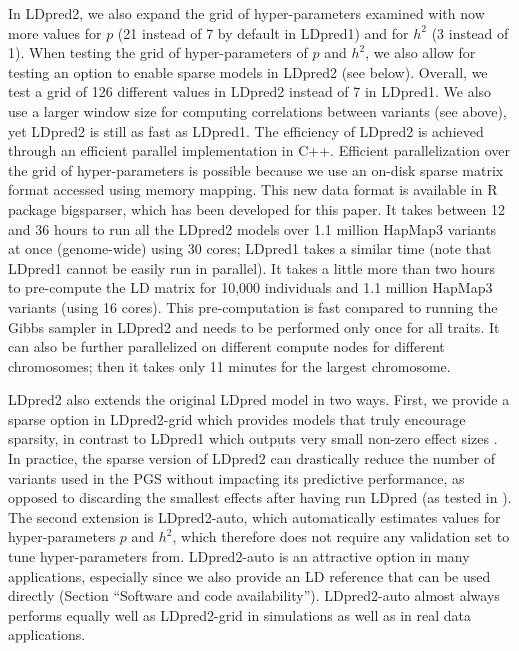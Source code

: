 \documentclass{bioinfo}
\begin{document}
In LDpred2, we also expand the grid of hyper-parameters examined with now more values for $p$ (21 instead of 7 by default in LDpred1) and for $h^2$ (3 instead of 1).
When testing the grid of hyper-parameters of $p$ and $h^2$, we also allow for testing an option to enable sparse models in LDpred2 (see below).
Overall, we test a grid of 126 different values in LDpred2 instead of 7 in LDpred1.
We also use a larger window size for computing correlations between variants (see above), yet LDpred2 is still as fast as LDpred1.
The efficiency of LDpred2 is achieved through an efficient parallel implementation in C++.
Efficient parallelization over the grid of hyper-parameters is possible because we use an on-disk sparse matrix format accessed using memory mapping. 
This new data format is available in R package bigsparser, which has been developed for this paper. 
It takes between 12 and 36 hours to run all the LDpred2 models over 1.1 million HapMap3 variants at once (genome-wide) using 30 cores; LDpred1 takes a similar time (note that LDpred1 cannot be easily run in parallel).
It takes a little more than two hours to pre-compute the LD matrix for 10,000 individuals and 1.1 million HapMap3 variants (using 16 cores). This pre-computation is fast compared to running the Gibbs sampler in LDpred2 and needs to be performed only once for all traits. It can also be further parallelized on different compute nodes for different chromosomes; then it takes only 11 minutes for the largest chromosome.

LDpred2 also extends the original LDpred model in two ways.
First, we provide a sparse option in LDpred2-grid which provides models that truly encourage sparsity, in contrast to LDpred1 which outputs very small non-zero effect sizes \cite[]{cecile2019polygenic}.
In practice, the sparse version of LDpred2 can drastically reduce the number of variants used in the PGS without impacting its predictive performance, as opposed to discarding the smallest effects after having run LDpred (as tested in \cite{bolli2019software}).
The second extension is LDpred2-auto, which automatically estimates values for hyper-parameters $p$ and $h^2$, which therefore does not require any validation set to tune hyper-parameters from. 
LDpred2-auto is an attractive option in many applications, especially since we also provide an LD reference that can be used directly (Section ``Software and code availability'').
LDpred2-auto almost always performs equally well as LDpred2-grid in simulations as well as in real data applications.
\end{document}
